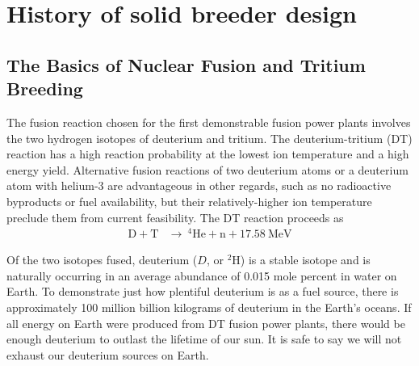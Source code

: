\chapter{History of solid breeder design}\label{sec:solid-breeder-history}


\section{The Basics of Nuclear Fusion and Tritium Breeding}\label{sec:fusion-basics}

The fusion reaction chosen for the first demonstrable fusion power plants involves the two hydrogen isotopes of deuterium and tritium. The deuterium-tritium (DT) reaction has a high reaction probability at the lowest ion temperature and a high energy yield. Alternative fusion reactions of two deuterium atoms or a deuterium atom with helium-3 are advantageous in other regards, such as no radioactive byproducts or fuel availability, but their relatively-higher ion temperature preclude them from current feasibility.\cite{abdou} The DT reaction proceeds as
\begin{align}
	\mathrm{D} + \mathrm{T}&\xrightarrow{}\ ^4\mathrm{He}+\mathrm{n}+17.58\ \text{MeV} \label{eq:dt-reaction}
\end{align}

Of the two isotopes fused, deuterium ($D$, or $^2$H) is a stable isotope and is naturally occurring in an average abundance of 0.015 mole percent in water on Earth. To demonstrate just how plentiful deuterium is as a fuel source, there is approximately 100 million billion kilograms of deuterium in the Earth's oceans. If all energy on Earth were produced from DT fusion power plants, there would be enough deuterium to outlast the lifetime of our sun. It is safe to say we will not exhaust our deuterium sources on Earth.

